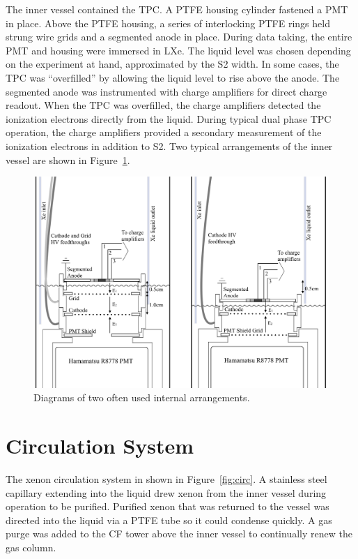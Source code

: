 The inner vessel contained the \ac{TPC}. A PTFE housing cylinder fastened a PMT in place. Above the PTFE housing, a series of interlocking PTFE rings held strung wire grids and a segmented anode in place. During data taking, the entire PMT and housing were immersed in \ac{LXe}. The liquid level was chosen depending on the experiment at hand, approximated by the S2 width. In some cases, the TPC was ``overfilled'' by allowing the liquid level to rise above the anode. The segmented anode was instrumented with charge amplifiers for direct charge readout. When the \ac{TPC} was overfilled, the charge amplifiers detected the ionization electrons directly from the liquid. During typical dual phase \ac{TPC} operation, the charge amplifiers provided a secondary measurement of the ionization electrons in addition to S2. Two typical arrangements of the inner vessel are shown in Figure~\ref{fig:internals}.

\begin{figure}[htbp]
\begin{center}
\includegraphics[width=\textwidth]{figures/testbed/internals_1and2.png}
\caption{Diagrams of two often used internal arrangements. }
\label{fig:internals}
\end{center}
\end{figure}


\section{Circulation System}
The xenon circulation system in shown in Figure~\ref{fig:circ}. A stainless steel capillary extending into the liquid drew xenon from the inner vessel during operation to be purified. Purified xenon that was returned to the vessel was directed into the liquid via a PTFE tube so it could condense quickly. A gas purge was added to the \ac{CF} tower above the inner vessel to continually renew the gas column. 

